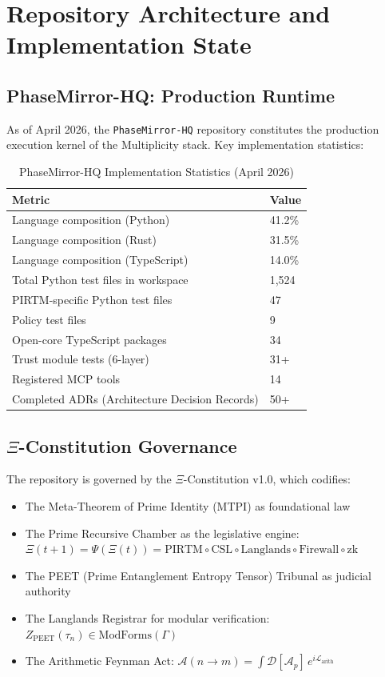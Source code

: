 \documentclass[12pt,letterpaper]{article}
\theoremstyle{definition}
\theoremstyle{remark}
\begin{document}
\section{Repository Architecture and Implementation State}

\subsection{PhaseMirror-HQ: Production Runtime}

As of April 2026, the \texttt{PhaseMirror-HQ} repository constitutes the production execution kernel of the Multiplicity stack. Key implementation statistics:

\begin{table}[H]
\centering
\caption{PhaseMirror-HQ Implementation Statistics (April 2026)}
\begin{tabular}{ll}
\toprule
\textbf{Metric} & \textbf{Value} \\
\midrule
Language composition (Python) & 41.2\% \\
Language composition (Rust) & 31.5\% \\
Language composition (TypeScript) & 14.0\% \\
Total Python test files in workspace & 1,524 \\
PIRTM-specific Python test files & 47 \\
Policy test files & 9 \\
Open-core TypeScript packages & 34 \\
Trust module tests (6-layer) & 31+ \\
Registered MCP tools & 14 \\
Completed ADRs (Architecture Decision Records) & 50+ \\
\bottomrule
\end{tabular}
\end{table}

\subsection{$\Xi$-Constitution Governance}

The repository is governed by the $\Xi$-Constitution v1.0, which codifies:
\begin{itemize}[noitemsep]
\item The Meta-Theorem of Prime Identity (MTPI) as foundational law
\item The Prime Recursive Chamber as the legislative engine: $\Xi(t+1) = \Psi(\Xi(t)) = \text{PIRTM} \circ \text{CSL} \circ \text{Langlands} \circ \text{Firewall} \circ \text{zk}$
\item The PEET (Prime Entanglement Entropy Tensor) Tribunal as judicial authority
\item The Langlands Registrar for modular verification: $Z_{\text{PEET}}(\tau_n) \in \text{ModForms}(\Gamma)$
\item The Arithmetic Feynman Act: $\mathcal{A}(n \to m) = \int \mathcal{D}[\mathcal{A}_p]\, e^{i\mathcal{L}_{\mathrm{arith}}}$
\end{itemize}
\end{document}
